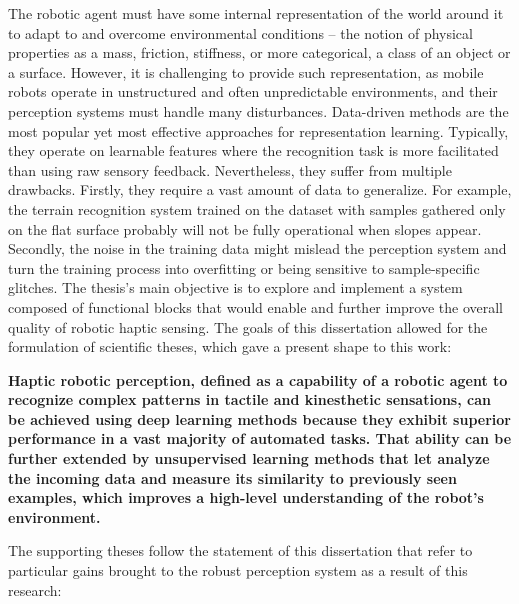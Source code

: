\documentclass[a4paper, 10pt, twoside]{report}
\begin{document}
The robotic agent must have some internal representation of the world around it to adapt to and overcome environmental conditions -- the notion of physical properties as a mass, friction, stiffness, or more categorical, \eg a class of an object or a surface. However, it is challenging to provide such representation, as mobile robots operate in unstructured and often unpredictable environments, and their perception systems must handle many disturbances. Data-driven methods are the most popular yet most effective approaches for representation learning. Typically, they operate on learnable features where the recognition task is more facilitated than using raw sensory feedback. Nevertheless, they suffer from multiple drawbacks. Firstly, they require a vast amount of data to generalize. For example, the terrain recognition system trained on the dataset with samples gathered only on the flat surface probably will not be fully operational when slopes appear. Secondly, the noise in the training data might mislead the perception system and turn the training process into overfitting or being sensitive to sample-specific glitches. The thesis's main objective is to explore and implement a system composed of functional blocks that would enable and further improve the overall quality of robotic haptic sensing. The goals of this dissertation allowed for the formulation of scientific theses, which gave a present shape to this work:

\textbf{Haptic robotic perception, defined as a capability of a robotic agent to recognize complex patterns in tactile and kinesthetic sensations, can be achieved using deep learning methods because they exhibit superior performance in a vast majority of automated tasks. That ability can be further extended by unsupervised learning methods that let analyze the incoming data and measure its similarity to previously seen examples, which improves a high-level understanding of the robot's environment.}

The supporting theses follow the statement of this dissertation that refer to particular gains brought to the robust perception system as a result of this research:
\end{document}
